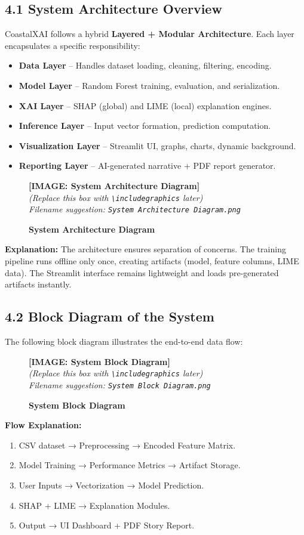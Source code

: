 \documentclass[12pt, a4paper]{article}
\newcommand{\imageplaceholder}[2]{
  \begin{figure}[H]
    \centering
    \begin{tcolorbox}[colback=white, colframe=black, width=0.8\textwidth, arc=0mm, boxrule=1pt]
      \centering
      \vspace{#2}
      \textbf{\Large [IMAGE: #1]}\\
      \vspace{0.5cm}
      \textit{(Replace this box with \texttt{\textbackslash includegraphics} later)}\\
      \textit{Filename suggestion: \texttt{#1.png}}
      \vspace{#2}
    \end{tcolorbox}
    \caption{\textbf{#1}}
    \label{fig:#1}
  \end{figure}
}
\begin{document}
\subsection{\textbf{4.1 System Architecture Overview}}

CoastalXAI follows a hybrid \textbf{Layered + Modular Architecture}. Each layer encapsulates a specific responsibility:

\begin{itemize}
    \item \textbf{Data Layer} – Handles dataset loading, cleaning, filtering, encoding.
    \item \textbf{Model Layer} – Random Forest training, evaluation, and serialization.
    \item \textbf{XAI Layer} – SHAP (global) and LIME (local) explanation engines.
    \item \textbf{Inference Layer} – Input vector formation, prediction computation.
    \item \textbf{Visualization Layer} – Streamlit UI, graphs, charts, dynamic background.
    \item \textbf{Reporting Layer} – AI-generated narrative + PDF report generator.
\end{itemize}

\imageplaceholder{System Architecture Diagram}{6cm}

\noindent
\textbf{Explanation:}  
The architecture ensures separation of concerns. The training pipeline runs offline only once, creating artifacts (model, feature columns, LIME data). The Streamlit interface remains lightweight and loads pre-generated artifacts instantly.

\subsection{\textbf{4.2 Block Diagram of the System}}

The following block diagram illustrates the end-to-end data flow:

\imageplaceholder{System Block Diagram}{6cm}

\noindent
\textbf{Flow Explanation:}

\begin{enumerate}
    \item CSV dataset → Preprocessing → Encoded Feature Matrix.
    \item Model Training → Performance Metrics → Artifact Storage.
    \item User Inputs → Vectorization → Model Prediction.
    \item SHAP + LIME → Explanation Modules.
    \item Output → UI Dashboard + PDF Story Report.
\end{enumerate}
\end{document}
